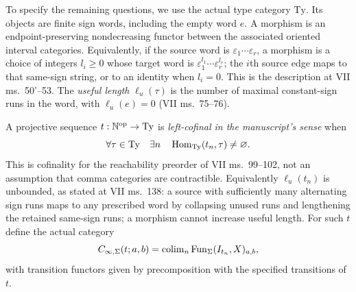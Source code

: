 To specify the remaining questions, we use the actual type category $\mathrm{Ty}$. Its objects are finite sign words, including the empty word $e$. A morphism is an endpoint-preserving nondecreasing functor between the associated oriented interval categories. Equivalently, if the source word is $\varepsilon_1\cdots\varepsilon_r$, a morphism is a choice of integers $l_i\geq0$ whose target word is $\varepsilon_1^{l_1}\cdots\varepsilon_r^{l_r}$; the $i$th source edge maps to that same-sign string, or to an identity when $l_i=0$. This is the description at VII ms.~50'--53. The \emph{useful length} $\ell_u(\tau)$ is the number of maximal constant-sign runs in the word, with $\ell_u(e)=0$ (VII ms.~75--76).

A projective sequence $t:\mathbb N^{\mathrm{op}}\to\mathrm{Ty}$ is \emph{left-cofinal in the manuscript's sense} when
\[
       \forall\tau\in\mathrm{Ty}\quad
       \exists n\quad\operatorname{Hom}_{\mathrm{Ty}}(t_n,\tau)\ne\varnothing.
\]
This is cofinality for the reachability preorder of VII ms.~99--102, not an assumption that comma categories are contractible. Equivalently $\ell_u(t_n)$ is unbounded, as stated at VII ms.~138: a source with sufficiently many alternating sign runs maps to any prescribed word by collapsing unused runs and lengthening the retained same-sign runs; a morphism cannot increase useful length. For such $t$ define the actual category
\[
 C_{\infty,\Sigma}(t;a,b)
   =\operatorname{colim}_n\operatorname{Fun}_\Sigma(I_{t_n},X)_{a,b},
\]
with transition functors given by precomposition with the specified transitions of $t$.

